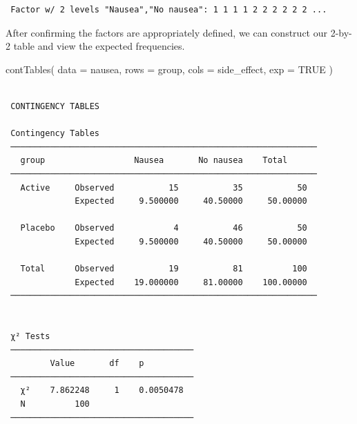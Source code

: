 \documentclass[
  a4paper,
]{memoir}
\newenvironment{Shaded}{\begin{snugshade}}{\end{snugshade}}
\newcommand{\AttributeTok}[1]{\textcolor[rgb]{0.00,0.00,0.00}{#1}}
\newcommand{\ConstantTok}[1]{\textcolor[rgb]{0.00,0.00,0.00}{#1}}
\newcommand{\FunctionTok}[1]{\textcolor[rgb]{0.00,0.00,0.00}{#1}}
\newcommand{\NormalTok}[1]{\textcolor[rgb]{0.00,0.00,0.00}{#1}}
\newcommand{\SpecialCharTok}[1]{\textcolor[rgb]{0.00,0.00,0.00}{#1}}
\begin{document}
\begin{Shaded}
\end{Shaded}

\begin{verbatim}
 Factor w/ 2 levels "Nausea","No nausea": 1 1 1 1 2 2 2 2 2 2 ...
\end{verbatim}

After confirming the factors are appropriately defined, we can construct
our 2-by-2 table and view the expected frequencies.

\begin{Shaded}
\begin{Highlighting}[]
\FunctionTok{contTables}\NormalTok{(}
    \AttributeTok{data =}\NormalTok{ nausea,}
    \AttributeTok{rows =}\NormalTok{ group, }\AttributeTok{cols =}\NormalTok{ side\_effect,}
    \AttributeTok{exp =} \ConstantTok{TRUE}
\NormalTok{)}
\end{Highlighting}
\end{Shaded}

\begin{verbatim}

 CONTINGENCY TABLES

 Contingency Tables                                             
 ────────────────────────────────────────────────────────────── 
   group                  Nausea       No nausea    Total       
 ────────────────────────────────────────────────────────────── 
   Active     Observed           15           35           50   
              Expected     9.500000     40.50000     50.00000   
                                                                
   Placebo    Observed            4           46           50   
              Expected     9.500000     40.50000     50.00000   
                                                                
   Total      Observed           19           81          100   
              Expected    19.000000     81.00000    100.00000   
 ────────────────────────────────────────────────────────────── 


 χ² Tests                              
 ───────────────────────────────────── 
         Value       df    p           
 ───────────────────────────────────── 
   χ²    7.862248     1    0.0050478   
   N          100                      
 ───────────────────────────────────── 
\end{verbatim}
\end{document}
